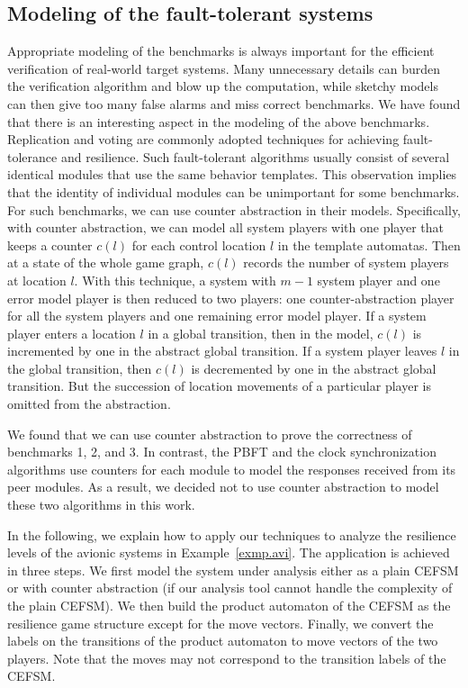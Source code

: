\subsection{Modeling of the fault-tolerant systems}
Appropriate modeling of the benchmarks is always important for 
the efficient verification of real-world target systems. 
Many unnecessary details can burden the verification algorithm 
and blow up the computation, 
while sketchy models can then give too many false alarms 
and miss correct benchmarks.  
We have found that there is an interesting aspect 
in the modeling of the above benchmarks.  
Replication and voting are commonly adopted techniques for 
achieving fault-tolerance and resilience.  
Such fault-tolerant algorithms usually consist of 
several identical modules that use the same behavior templates.  
This observation implies that the identity of individual modules 
can be unimportant for some benchmarks.  
For such benchmarks, we can use counter abstraction 
\cite{ET99,Lubachevsky84} in their models.  
\label{reply1.counter.abstraction} 
Specifically, with counter abstraction, 
we can model all system players with one player that keeps a counter $c(l)$ 
for each control location $l$ in the template automatas. 
Then at a state of the whole game graph, 
$c(l)$ records the number of system players at location $l$.  
With this technique, a system with $m-1$ system player and one error model player is 
then reduced to two players: one counter-abstraction player for all the system players and one 
remaining error model player. 
If a system player enters a location $l$ in a global transition, 
then in the model, $c(l)$ is incremented by one in the abstract global transition. 
If a system player leaves $l$ in the global transition, 
then $c(l)$ is decremented by one in the abstract global transition.  
But the succession of location movements of a particular player is omitted from the abstraction. 
 

We found that we can use counter abstraction to 
prove the correctness of benchmarks 1, 2, and 3. 
In contrast, the PBFT and the clock synchronization algorithms use 
counters for each module to model the responses received 
from its peer modules. 
As a result, we decided not to use counter abstraction to model 
these two algorithms in this work. 

In the following, we explain how to apply our techniques to analyze 
the resilience levels of the avionic systems 
in Example~\ref{exmp.avi}.  
The application is achieved in three steps.\label{reply2.3step.model} 
We first model the system under analysis either as a plain CEFSM or with counter abstraction (if our analysis tool cannot handle the complexity of the plain CEFSM).
We then build the product automaton of the CEFSM as the resilience 
game structure except for the move vectors.  
Finally, we convert the labels on the transitions of the product automaton to 
move vectors of the two players. 
Note that the moves may not correspond to the transition labels of the CEFSM.  

